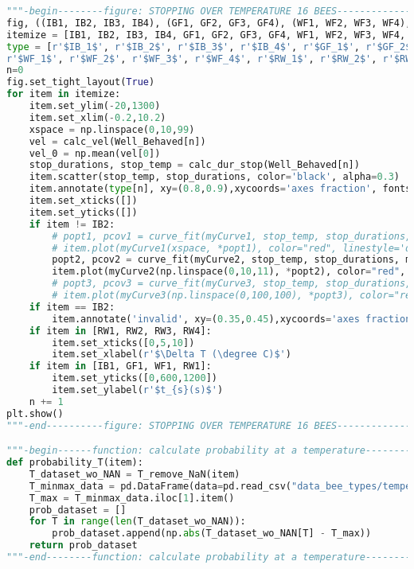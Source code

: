 \begin{lstlisting}[language=Python, basicstyle=\tiny, frame=single, keywordstyle=\color{teal}, commentstyle=\color{olive}, stringstyle=\color{red}]
"""-begin--------figure: STOPPING OVER TEMPERATURE 16 BEES-------------------"""
fig, ((IB1, IB2, IB3, IB4), (GF1, GF2, GF3, GF4), (WF1, WF2, WF3, WF4), (RW1, RW2, RW3, RW4)) = plt.subplots(4, 4, figsize=(10,10))
itemize = [IB1, IB2, IB3, IB4, GF1, GF2, GF3, GF4, WF1, WF2, WF3, WF4, RW1, RW2, RW3, RW4]
type = [r'$IB_1$', r'$IB_2$', r'$IB_3$', r'$IB_4$', r'$GF_1$', r'$GF_2$', r'$GF_3$', r'$GF_4$', 
r'$WF_1$', r'$WF_2$', r'$WF_3$', r'$WF_4$', r'$RW_1$', r'$RW_2$', r'$RW_3$', r'$RW_4$']
n=0
fig.set_tight_layout(True)
for item in itemize:
    item.set_ylim(-20,1300)
    item.set_xlim(-0.2,10.2)
    xspace = np.linspace(0,10,99)
    vel = calc_vel(Well_Behaved[n])
    vel_0 = np.mean(vel[0])
    stop_durations, stop_temp = calc_dur_stop(Well_Behaved[n])
    item.scatter(stop_temp, stop_durations, color='black', alpha=0.3)
    item.annotate(type[n], xy=(0.8,0.9),xycoords='axes fraction', fontsize=12)
    item.set_xticks([])
    item.set_yticks([])
    if item != IB2:
        # popt1, pcov1 = curve_fit(myCurve1, stop_temp, stop_durations, maxfev = 200000, p0=(0,0))
        # item.plot(myCurve1(xspace, *popt1), color="red", linestyle='dashdot', label='t/(1+bx)')
        popt2, pcov2 = curve_fit(myCurve2, stop_temp, stop_durations, maxfev = 200000, p0=(0,0))
        item.plot(myCurve2(np.linspace(0,10,11), *popt2), color="red", linestyle='dotted', label='t*e^(-bx)')
        # popt3, pcov3 = curve_fit(myCurve3, stop_temp, stop_durations, maxfev = 200000, p0=(0,0,0))
        # item.plot(myCurve3(np.linspace(0,100,100), *popt3), color="red", linestyle='dashed', label='t*(bx)^g')
    if item == IB2:
        item.annotate('invalid', xy=(0.35,0.45),xycoords='axes fraction', color='red', fontsize=12)
    if item in [RW1, RW2, RW3, RW4]:
        item.set_xticks([0,5,10])
        item.set_xlabel(r'$\Delta T (\degree C)$')
    if item in [IB1, GF1, WF1, RW1]:
        item.set_yticks([0,600,1200])
        item.set_ylabel(r'$t_{s}(s)$')
    n += 1
plt.show()
"""-end----------figure: STOPPING OVER TEMPERATURE 16 BEES-------------------"""

"""-begin------function: calculate probability at a temperature--------------"""
def probability_T(item):
    T_dataset_wo_NAN = T_remove_NaN(item)
    T_minmax_data = pd.DataFrame(data=pd.read_csv("data_bee_types/temperature_variables.csv"), columns=[item])
    T_max = T_minmax_data.iloc[1].item()
    prob_dataset = []
    for T in range(len(T_dataset_wo_NAN)):
        prob_dataset.append(np.abs(T_dataset_wo_NAN[T] - T_max))
    return prob_dataset
"""-end--------function: calculate probability at a temperature--------------"""


\end{lstlisting}
